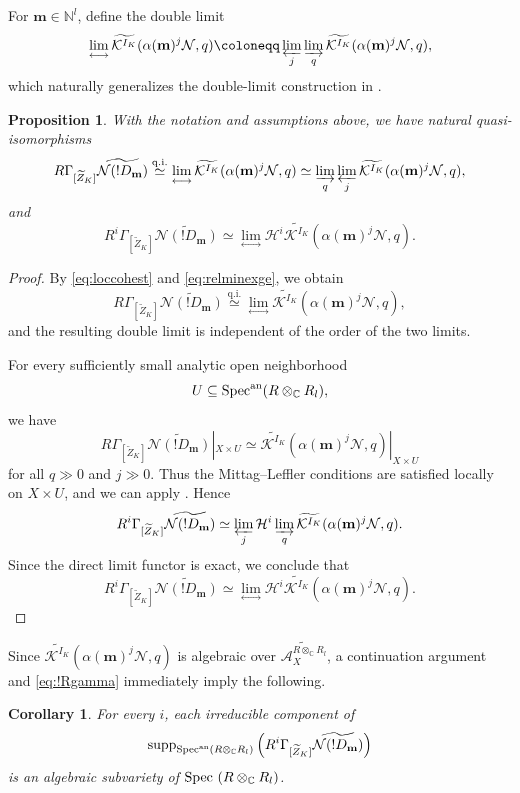 \documentclass{amsart}
\theoremstyle{plain}
\numberwithin{theorem}{section}
\newtheorem{prop}[theorem]{Proposition}
\newtheorem{coro}[theorem]{Corollary}
\theoremstyle{definition}
\theoremstyle{remark}
\theoremstyle{definition}
\newcommand{\wt}{\widetilde}
\newcommand{\C}{\mathbb{C}} %
\newcommand{\N}{\mathbb{N}}
\newcommand{\cH}{\mathcal{H}}
\newcommand{\cK}{\mathcal{K}}
\newcommand{\cN}{\mathcal{N}}
\newcommand{\bm}{\mathbf{m}}
\newcommand{\sA}{\mathscr{A}}
\newcommand{\Spec}{\textup{Spec }}
\newcommand{\Specan}{\textup{Spec}^{\textup{an}}}
\newcommand{\supp}{\textup{supp}}
\begin{document}
For $\bm\in \N^l$, define the double limit
\[
\lim_{\longleftrightarrow}
\wt{\cK^{I_K}}(\alpha(\bm)^j\cN,q)
\coloneqq
\varprojlim_j
\varinjlim_q
\wt{\cK^{I_K}}(\alpha(\bm)^j\cN,q),
\]
which naturally generalizes the double-limit construction in \cite{Beiglue}.

\begin{prop}\label{prop:doublelimitrgamma}
With the notation and assumptions above, we have natural quasi-isomorphisms
\[
R\Gamma_{[\wt Z_K]}\wt{\cN(!D_\bm)}
\stackrel{\mathrm{q.i.}}{\simeq}
\lim_{\longleftrightarrow}
\wt{\cK^{I_K}}(\alpha(\bm)^j\cN,q)
\simeq
\varinjlim_q
\varprojlim_j
\wt{\cK^{I_K}}(\alpha(\bm)^j\cN,q),
\]
and
\[
R^i\Gamma_{[\wt Z_K]}\wt{\cN(!D_\bm)}
\simeq
\lim_{\longleftrightarrow}
\cH^i\wt{\cK^{I_K}}(\alpha(\bm)^j\cN,q).
\]
\end{prop}

\begin{proof}
By \eqref{eq:loccohest} and \eqref{eq:relminexge}, we obtain
\[
R\Gamma_{[\wt Z_K]}\wt{\cN(!D_\bm)}
\stackrel{\mathrm{q.i.}}{\simeq}
\lim_{\longleftrightarrow}
\wt{\cK^{I_K}}(\alpha(\bm)^j\cN,q),
\]
and the resulting double limit is independent of the order of the two limits.

For every sufficiently small analytic open neighborhood
\[
U\subseteq \Specan(R\otimes_\C R_l),
\]
we have
\begin{equation}\label{eq:!Rgamma}
R\Gamma_{[\wt Z_K]}\wt{\cN(!D_\bm)}|_{X\times U}
\simeq
\wt{\cK^{I_K}}(\alpha(\bm)^j\cN,q)|_{X\times U}
\end{equation}
for all $q\gg 0$ and $j\gg 0$. Thus the Mittag--Leffler conditions are
satisfied locally on $X\times U$, and we can apply
\cite[Prop.1.12.4]{KSbook}. Hence
\[
R^i\Gamma_{[\wt Z_K]}\wt{\cN(!D_\bm)}
\simeq
\varprojlim_j
\cH^i
\varinjlim_q
\wt{\cK^{I_K}}(\alpha(\bm)^j\cN,q).
\]
Since the direct limit functor is exact, we conclude that
\[
R^i\Gamma_{[\wt Z_K]}\wt{\cN(!D_\bm)}
\simeq
\lim_{\longleftrightarrow}
\cH^i\wt{\cK^{I_K}}(\alpha(\bm)^j\cN,q).
\]
\end{proof}

Since $\wt{\cK^{I_K}}(\alpha(\bm)^j\cN,q)$ is algebraic over
$\wt{\sA_X^{R\otimes_\C R_l}}$, a continuation
argument and \eqref{eq:!Rgamma} immediately imply the following.

\begin{coro}\label{cor:algsupploccoh}
For every $i$, each irreducible component of
\[
\supp_{\Specan(R\otimes_\C R_l)}
\left(
R^i\Gamma_{[\wt Z_K]}\wt{\cN(!D_\bm)}
\right)
\]
is an algebraic subvariety of $\Spec(R\otimes_\C R_l)$.
\end{coro}
\end{document}
